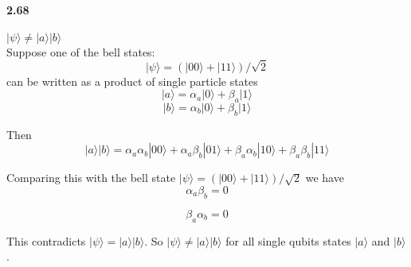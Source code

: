 \paragraph{2.68} \textbf{$|\psi\rangle \ne |a\rangle |b\rangle$} \\%

Suppose one of the bell states:
$$|\psi\rangle = (|00\rangle + |11\rangle) / \sqrt{2}$$ can be written as a product of single particle states
$$ |a\rangle = \alpha_a |0\rangle + \beta_a |1\rangle$$
$$ |b\rangle = \alpha_b |0\rangle + \beta_b |1\rangle$$

Then
$$|a\rangle |b\rangle = \alpha_a \alpha_b |00\rangle + \alpha_a \beta_b |01\rangle  + \beta_a \alpha_b |10\rangle + \beta_a \beta_b |11\rangle $$

Comparing this with the bell state
$|\psi\rangle = (|00\rangle + |11\rangle) / \sqrt{2}$
 we have 
$$ \alpha_a \beta_b = 0$$

$$ \beta_a \alpha_b = 0$$

This contradicts $|\psi\rangle = |a\rangle|b\rangle$. So $|\psi\rangle \ne |a\rangle |b\rangle$ for all single qubits states $|a\rangle $ and $|b\rangle$.